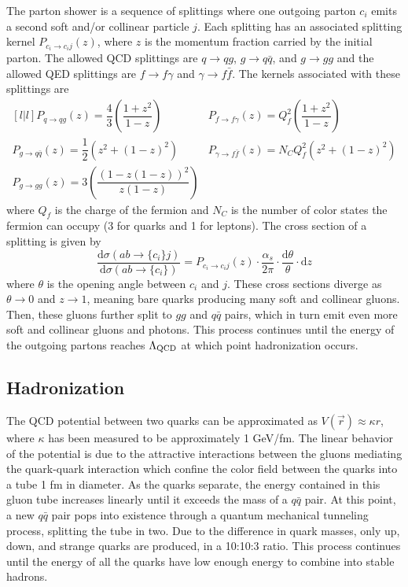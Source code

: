 The parton shower is a sequence of splittings where one outgoing parton $c_i$ emits a second soft and/or collinear particle $j$.
Each splitting has an associated splitting kernel $P_{c_i \rightarrow c_i j}(z)$, where $z$ is the momentum fraction carried by the initial parton.
The allowed QCD splittings are $q\rightarrow qg$, $g\rightarrow q \bar q$, and $g\rightarrow gg$ and the allowed QED splittings are $f\rightarrow f\gamma$ and $\gamma \rightarrow f \bar f$.
The kernels associated with these splittings are
\begin{equation}
  \begin{matrix}[l | l]
    P_{q\rightarrow qg}(z) = \dfrac{4}{3} \left( \dfrac{1+z^2}{1-z} \right)
    & P_{f \rightarrow f \gamma}(z) = Q_f^2 \left( \dfrac{1+z^2}{1-z} \right)
    \\ P_{g\rightarrow q \bar q}(z) = \dfrac{1}{2} \left( z^2 + (1-z)^2\right)
    & P_{\gamma \rightarrow f \bar f}(z) = N_C Q_f^2 \left( z^2 + (1-z)^2 \right) 
    \\ P_{g\rightarrow gg}(z) = 3 \left( \dfrac{(1-z(1-z))^2}{z(1-z)} \right)  & 
  \end{matrix}
\end{equation}
where $Q_f$ is the charge of the fermion and $N_C$ is the number of color states the fermion can occupy (3 for quarks and 1 for leptons).
The cross section of a splitting is given by
\begin{equation}
  \frac{\text{d}\sigma (ab\rightarrow \{c_i\}j)}{\text{d}\sigma (ab\rightarrow \{c_i\})}
  = P_{c_i\rightarrow c_i j}(z) \cdot \frac{\alpha_s}{2\pi} \cdot \frac{\text{d}\theta}{\theta} \cdot \text{d}z 
\end{equation}
where $\theta$ is the opening angle between $c_i$ and $j$.
These cross sections diverge as $\theta \rightarrow 0$ and $z \rightarrow 1$, meaning bare quarks producing many soft and collinear gluons.
Then, these gluons further split to $gg$ and $q\bar q$ pairs, which in turn emit even more soft and collinear gluons and photons.
This process continues until the energy of the outgoing partons reaches $\Lambda_{\text{QCD}}$ at which point hadronization occurs.

\subsection{Hadronization}

The QCD potential between two quarks can be approximated as $ V(\vec r) \approx \kappa r$, where $\kappa$ has been measured to be approximately 1 GeV/fm.
The linear behavior of the potential is due to the attractive interactions between the gluons mediating the quark-quark interaction which confine the color field between the quarks into a tube 1 fm in diameter.
As the quarks separate, the energy contained in this gluon tube increases linearly until it exceeds the mass of a $q\bar q$ pair.
At this point, a new $q \bar q$ pair pops into existence through a quantum mechanical tunneling process, splitting the tube in two.
Due to the difference in quark masses, only up, down, and strange quarks are produced, in a 10:10:3 ratio.
This process continues until the energy of all the quarks have low enough energy to combine into stable hadrons.

